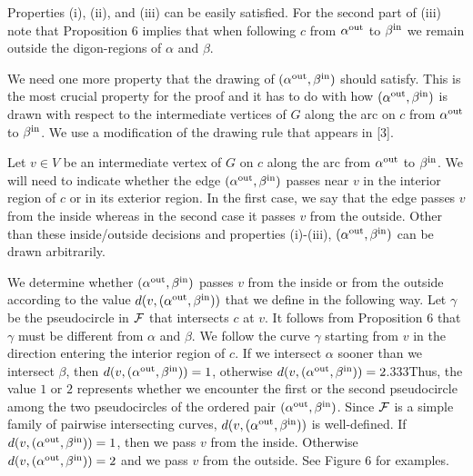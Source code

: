 \par
Properties (i), (ii), and (iii) can be easily satisfied. For the second part of (iii) note that Proposition 6 implies that when following $c$ from $\alpha^{\rm out}$ to $\beta^{\rm in}$ we remain outside the digon-regions of $\alpha$ and $\beta$.
\par
\par
We need one more property that the drawing of $(\alpha^{\rm out},\beta^{\rm in})$ should satisfy. This is the most crucial property for the proof and it has to do with how $(\alpha^{\rm out},\beta^{\rm in})$ is drawn with respect to the intermediate vertices of $G$ along the arc on $c$ from $\alpha^{\rm out}$ to $\beta^{\rm in}$. We use a modification of the drawing rule that appears in [3].
\par
\par
Let $v\in V$ be an intermediate vertex of $G$ on $c$ along the arc from $\alpha^{\rm out}$ to $\beta^{\rm in}$. We will need to indicate whether the edge $(\alpha^{\rm out},\beta^{\rm in})$ passes near $v$ in the interior region of $c$ or in its exterior region. In the first case, we say that the edge passes $v$ from the inside whereas in the second case it passes $v$ from the outside. Other than these inside/outside decisions and properties (i)-(iii), $(\alpha^{\rm out},\beta^{\rm in})$ can be drawn arbitrarily.
\par
\par
We determine whether $(\alpha^{\rm out},\beta^{\rm in})$ passes $v$ from the inside or from the outside according to the value $d(v,(\alpha^{\rm out},\beta^{\rm in}))$ that we define in the following way. Let $\gamma$ be the pseudocircle in ${\cal{F}}$ that intersects $c$ at $v$. It follows from Proposition 6 that $\gamma$ must be different from $\alpha$ and $\beta$. We follow the curve $\gamma$ starting from $v$ in the direction entering the interior region of $c$. If we intersect $\alpha$ sooner than we intersect $\beta$, then $d(v,(\alpha^{\rm out},\beta^{\rm in}))=1$, otherwise $d(v,(\alpha^{\rm out},\beta^{\rm in}))=2$.333Thus, the value $1$ or $2$ represents whether we encounter the first or the second pseudocircle among the two pseudocircles of the ordered pair $(\alpha^{\rm out},\beta^{\rm in})$. Since ${\cal{F}}$ is a simple family of pairwise intersecting curves, $d(v,(\alpha^{\rm out},\beta^{\rm in}))$ is well-defined. If $d(v,(\alpha^{\rm out},\beta^{\rm in}))=1$, then we pass $v$ from the inside. Otherwise $d(v,(\alpha^{\rm out},\beta^{\rm in}))=2$ and we pass $v$ from the outside. See Figure 6 for examples.
